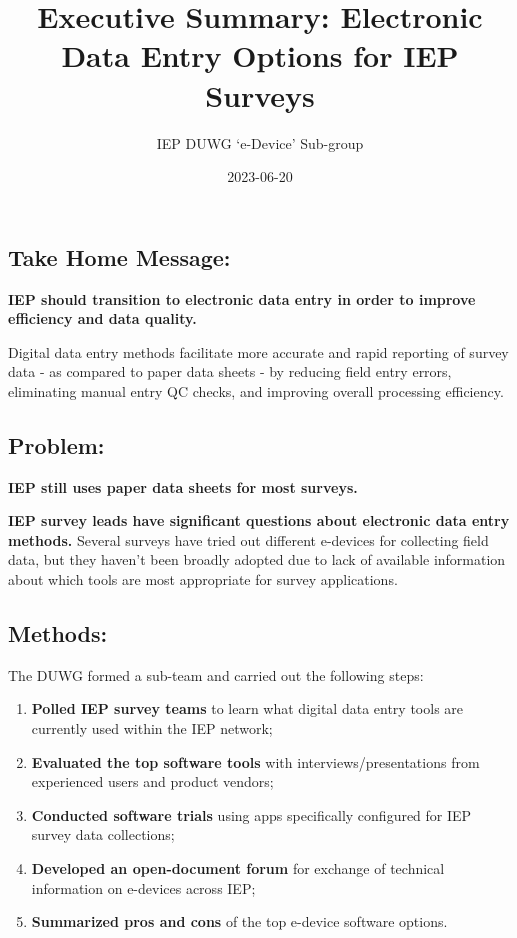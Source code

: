 \documentclass[
]{article}
\title{Executive Summary: Electronic Data Entry Options for IEP Surveys}
\author{IEP DUWG `e-Device' Sub-group}
\date{2023-06-20}
\providecommand{\tightlist}{%
  \setlength{\itemsep}{0pt}\setlength{\parskip}{0pt}}
\begin{document}
\maketitle

\hypertarget{take-home-message}{%
\subsection*{\texorpdfstring{\textbf{Take Home
Message:}}{Take Home Message:}}\label{take-home-message}}

\textbf{IEP should transition to electronic data entry in order to
improve efficiency and data quality.}

Digital data entry methods facilitate more accurate and rapid reporting
of survey data - as compared to paper data sheets - by reducing field
entry errors, eliminating manual entry QC checks, and improving overall
processing efficiency.

\hypertarget{problem}{%
\subsection*{\texorpdfstring{\textbf{Problem:}}{Problem:}}\label{problem}}

\textbf{IEP still uses paper data sheets for most surveys.}

\textbf{IEP survey leads have significant questions about electronic
data entry methods.} Several surveys have tried out different e-devices
for collecting field data, but they haven't been broadly adopted due to
lack of available information about which tools are most appropriate for
survey applications.

\hypertarget{methods}{%
\subsection*{\texorpdfstring{\textbf{Methods:}}{Methods:}}\label{methods}}

The DUWG formed a sub-team and carried out the following steps:

\begin{enumerate}
\def\labelenumi{\arabic{enumi}.}
\tightlist
\item
  \textbf{Polled IEP survey teams} to learn what digital data entry
  tools are currently used within the IEP network;
\item
  \textbf{Evaluated the top software tools} with
  interviews/presentations from experienced users and product vendors;
\item
  \textbf{Conducted software trials} using apps specifically configured
  for IEP survey data collections;
\item
  \textbf{Developed an open-document forum} for exchange of technical
  information on e-devices across IEP;
\item
  \textbf{Summarized pros and cons} of the top e-device software
  options.
\end{enumerate}
\end{document}
